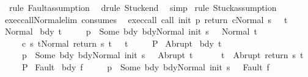 \begin{isabellebody}
\ \ {\isacharparenleft}rule\ Fault{\isacharcomma}assumption{\isacharplus}{\isacharparenright}\ \isanewline
{}\isamarkupfalse%
\ {\isacharparenleft}drule\ Stuck{\isacharunderscore}end{\isacharparenright}\ \isamarkupfalse%
\ simp\isanewline
{}\isamarkupfalse%
\ {\isacharparenleft}rule\ Stuck{\isacharcomma}assumption{\isacharplus}{\isacharparenright}\isanewline
{}\isamarkupfalse%
%
\endisatagproof
{\isafoldproof}%
%
\isadelimproof
\isanewline
%
\endisadelimproof
\isanewline
{}\isamarkupfalse%
\ exec{\isacharunderscore}call{\isacharunderscore}Normal{\isacharunderscore}elim\ {\isacharbrackleft}consumes\ {}{\isacharbrackright}{\isacharcolon}\isanewline
{}\ exec{\isacharunderscore}call{\isacharcolon}\ {\isachardoublequoteopen}{\isasymGamma}{\isasymturnstile}{\isasymlangle}call\ init\ p\ return\ c{\isacharcomma}Normal\ s{\isasymrangle}\ {\isasymRightarrow}\ \ t{\isachardoublequoteclose}\isanewline
{}\ Normal{\isacharcolon}\isanewline
\ {\isachardoublequoteopen}{\isasymAnd}bdy\ t{\isacharprime}{\isachardot}\isanewline
\ \ \ \ {\isasymlbrakk}{\isasymGamma}\ p\ {\isacharequal}\ Some\ bdy{\isacharsemicolon}\ {\isasymGamma}{\isasymturnstile}{\isasymlangle}bdy{\isacharcomma}Normal\ {\isacharparenleft}init\ s{\isacharparenright}{\isasymrangle}\ {\isasymRightarrow}\ \ Normal\ t{\isacharprime}{\isacharsemicolon}\isanewline
\ \ \ \ \ {\isasymGamma}{\isasymturnstile}{\isasymlangle}c\ s\ t{\isacharprime}{\isacharcomma}Normal\ {\isacharparenleft}return\ s\ t{\isacharprime}{\isacharparenright}{\isasymrangle}\ {\isasymRightarrow}\ \ t{\isasymrbrakk}\isanewline
\ \ \ \ {\isasymLongrightarrow}\ P{\isachardoublequoteclose}\isanewline
{}\ Abrupt{\isacharcolon}\isanewline
\ {\isachardoublequoteopen}{\isasymAnd}bdy\ t{\isacharprime}{\isachardot}\isanewline
\ \ \ \ {\isasymlbrakk}{\isasymGamma}\ p\ {\isacharequal}\ Some\ bdy{\isacharsemicolon}\ {\isasymGamma}{\isasymturnstile}{\isasymlangle}bdy{\isacharcomma}Normal\ {\isacharparenleft}init\ s{\isacharparenright}{\isasymrangle}\ {\isasymRightarrow}\ \ Abrupt\ t{\isacharprime}{\isacharsemicolon}\ \isanewline
\ \ \ \ \ t\ {\isacharequal}\ Abrupt\ {\isacharparenleft}return\ s\ t{\isacharprime}{\isacharparenright}{\isasymrbrakk}\isanewline
\ \ \ \ {\isasymLongrightarrow}\ P{\isachardoublequoteclose}\isanewline
{}\ Fault{\isacharcolon}\isanewline
\ {\isachardoublequoteopen}{\isasymAnd}bdy\ f{\isachardot}\isanewline
\ \ \ \ {\isasymlbrakk}{\isasymGamma}\ p\ {\isacharequal}\ Some\ bdy{\isacharsemicolon}\ {\isasymGamma}{\isasymturnstile}{\isasymlangle}bdy{\isacharcomma}Normal\ {\isacharparenleft}init\ s{\isacharparenright}{\isasymrangle}\ {\isasymRightarrow}\ \ Fault\ f{\isacharsemicolon}\ \isanewline

\end{isabellebody}
